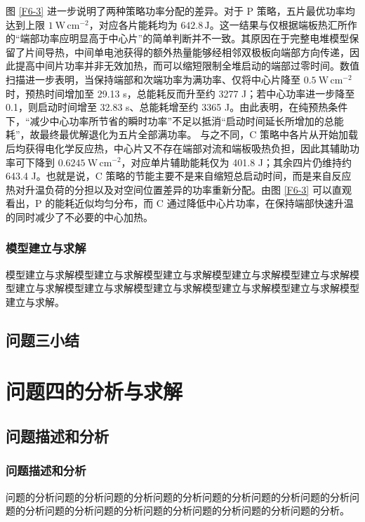\documentclass[bwprint]{gmcmthesis}
\numberwithin{figure}{section}
\begin{document}
图 \ref{F6-3} 进一步说明了两种策略功率分配的差异。对于 P 策略，五片最优功率均达到上限 \(1\ \mathrm{W\,cm^{-2}}\)，对应各片能耗均为 \(642.8\,\mathrm J\)。这一结果与仅根据端板热汇所作的“端部功率应明显高于中心片”的简单判断并不一致。其原因在于完整电堆模型保留了片间导热，中间单电池获得的额外热量能够经相邻双极板向端部方向传递，因此提高中间片功率并非无效加热，而可以缩短限制全堆启动的端部过零时间。数值扫描进一步表明，当保持端部和次端功率为满功率、仅将中心片降至 \(0.5\ \mathrm{W\,cm^{-2}}\) 时，预热时间增加至 29.13 s，总能耗反而升至约 3277 J；若中心功率进一步降至 0.1，则启动时间增至 32.83 s、总能耗增至约 3365 J。由此表明，在纯预热条件下，“减少中心功率所节省的瞬时功率”不足以抵消“启动时间延长所增加的总能耗”，故最终最优解退化为五片全部满功率。  
与之不同，C 策略中各片从开始加载后均获得电化学反应热，中心片又不存在端部对流和端板吸热负担，因此其辅助功率可下降到 \(0.6245\ \mathrm{W\,cm^{-2}}\)，对应单片辅助能耗仅为 401.8 J；其余四片仍维持约 643.4 J。也就是说，C 策略的节能主要不是来自缩短总启动时间，而是来自反应热对升温负荷的分担以及对空间位置差异的功率重新分配。由图 \ref{F6-3} 可以直观看出，P 的能耗近似均匀分布，而 C 通过降低中心片功率，在保持端部快速升温的同时减少了不必要的中心加热。   







\subsubsection{模型建立与求解}
模型建立与求解模型建立与求解模型建立与求解模型建立与求解模型建立与求解模型建立与求解模型建立与求解模型建立与求解模型建立与求解模型建立与求解模型建立与求解。
\subsection{问题三小结}

\section{问题四的分析与求解}
\subsection{问题描述和分析}
\subsubsection{问题描述和分析}
问题的分析问题的分析问题的分析问题的分析问题的分析问题的分析问题的分析问题的分析问题的分析问题的分析问题的分析问题的分析问题的分析问题的分析。
\end{document}
